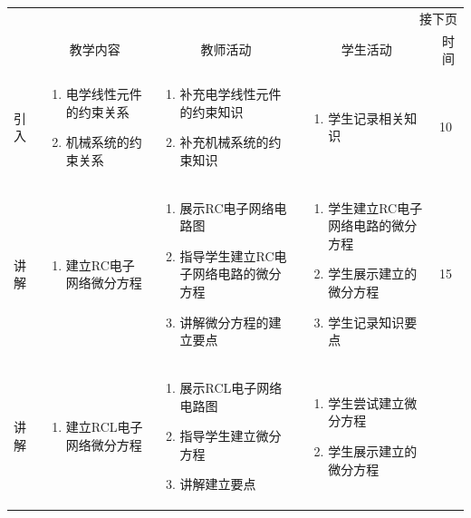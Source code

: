 {\begin{landscape}
\begin{longtable}{|m{10mm}|m{50mm}|m{50mm}|m{50mm}|m{15mm}|}
\multicolumn{5}{r}{\small 接下页}\\
\endfoot
\hline
\endlastfoot
\multicolumn{1}{|c|}{步骤}&\multicolumn{1}{c|}{教学内容}&\multicolumn{1}{c|}{教师活动}&\multicolumn{1}{c|}{学生活动}&\multicolumn{1}{c|}{时间}\\\hline
引入&\begin{enumerate}
\item 电学线性元件的约束关系
\item 机械系统的约束关系
\end{enumerate} &\begin{enumerate}
\item 补充电学线性元件的约束知识
\item 补充机械系统的约束知识
\end{enumerate} &\begin{enumerate}
\item 学生记录相关知识
\end{enumerate} &10 \\\hline
讲解&\begin{enumerate}
\item 建立RC电子网络微分方程
\end{enumerate}
 &\begin{enumerate}
\item 展示RC电子网络电路图
\item 指导学生建立RC电子网络电路的微分方程
\item 讲解微分方程的建立要点
\end{enumerate} &\begin{enumerate}
\item 学生建立RC电子网络电路的微分方程
\item 学生展示建立的微分方程
\item 学生记录知识要点
\end{enumerate} &15 \\\hline
讲解&\begin{enumerate}
\item 建立RCL电子网络微分方程
\end{enumerate}
&\begin{enumerate}
\item 展示RCL电子网络电路图
\item 指导学生建立微分方程
\item 讲解建立要点
\end{enumerate} &\begin{enumerate}
\item 学生尝试建立微分方程
\item 学生展示建立的微分方程

\end{enumerate}
\end{longtable}
\end{landscape}}
